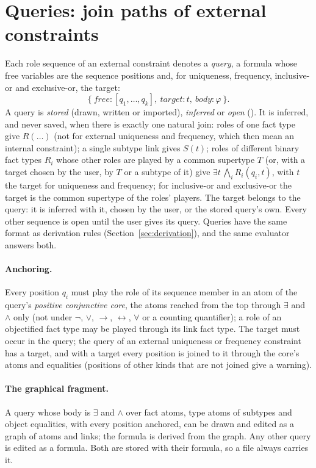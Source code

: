 \documentclass[11pt, a4paper]{article}
\begin{document}
\section{Queries: join paths of external constraints}
\label{sec:queries}

Each role sequence of an external constraint denotes a \emph{query}, a
formula whose free variables are the sequence positions and, for
uniqueness, frequency, inclusive-or and exclusive-or, the target:
\[
  \{\ \mathit{free}: [q_1,\dots,q_k],\ \mathit{target}: t,\ \mathit{body}: \varphi\ \}.
\]
A query is \emph{stored} (drawn, written or imported), \emph{inferred} or
\emph{open} (). It is inferred, and never
saved, when there is exactly one natural join: roles of one fact type give
$R(\dots)$ (not for external uniqueness and frequency, which then mean an
internal constraint); a single subtype link gives $S(t)$; roles of different
binary fact types $R_i$ whose other roles are played by a common supertype
$T$ (or, with a target chosen by the user, by $T$ or a subtype of it) give
$\exists t\,\bigwedge_i R_i(q_i, t)$, with $t$ the target for uniqueness and
frequency; for inclusive-or and exclusive-or the target is the common
supertype of the roles' players. The target belongs to the query: it is
inferred with it, chosen by the user, or the stored query's own. Every other
sequence is open until the user gives its query. Queries
have the same format as derivation rules (Section~\ref{sec:derivation}),
and the same evaluator answers both.

\paragraph{Anchoring.} Every position $q_i$ must play the role of its
sequence member in an atom of the query's \emph{positive conjunctive core},
the atoms reached from the top through $\exists$ and $\wedge$ only (not under
$\neg$, $\vee$, $\to$, $\leftrightarrow$, $\forall$ or a counting quantifier);
a role of an objectified fact type may be played through its link fact
type. The target must occur in the query; the query of an external
uniqueness or frequency constraint has a target, and with a target every
position is joined to it through the core's atoms and equalities (positions
of other kinds that are not joined give a warning).

\paragraph{The graphical fragment.} A query whose body is $\exists$ and
$\wedge$ over fact atoms, type atoms of subtypes and object equalities, with
every position anchored, can be drawn and edited as a graph of atoms and
links; the formula is derived from the graph. Any other query is edited as a
formula. Both are stored with their formula, so a file always carries it.
\end{document}
